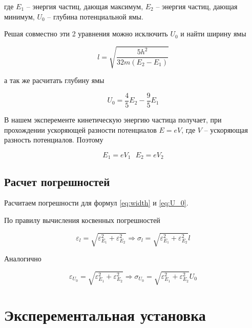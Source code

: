     где $E_1$ -- энергия частиц, дающая максимум, $E_2$ -- энергия частиц, дающая минимум, $U_0$ -- глубина потенциальной ямы.

    Решая совместно эти 2 уравнения можно исключить $U_0$ и найти ширину ямы

    \begin{equation} \label{eq:width}
        l = \sqrt{\frac{5 h^2}{32 m (E_2 - E_1)}}
    \end{equation}

    а так же расчитать глубину ямы

    \begin{equation} \label{eq:U_0}
        U_0 = \frac{4}{5}E_2 - \frac{9}{5}E_1
    \end{equation}

    В нашем эксперементе кинетическую энергию частица получает, при прохождении ускоряющей разности потенциалов $E = e V$, 
    где $V$ -- ускоряющая разность потенциалов. Поэтому

    \[ E_1 = e V_1 ~~~ E_2 = e V_2 \]

    \subsection*{Расчет погрешностей}

    Расчитаем погрешности для формул \eqref{eq:width} и \eqref{eq:U_0}.

    По правилу вычисления косвенных погрешностей

    \begin{equation}
        \varepsilon_l = \sqrt{\varepsilon_{E_1}^2 + \varepsilon_{E_2}^2} \Rightarrow \sigma_l = \sqrt{\varepsilon_{E_1}^2 + \varepsilon_{E_2}^2} l
    \end{equation}

    Аналогично

    \begin{equation}
        \varepsilon_{U_0} = \sqrt{\varepsilon_{E_1}^2 + \varepsilon_{E_2}^2} \Rightarrow \sigma_{U_0} = \sqrt{\varepsilon_{E_1}^2 + \varepsilon_{E_2}^2} U_0
    \end{equation}

    \section*{Эксперементальная установка}

